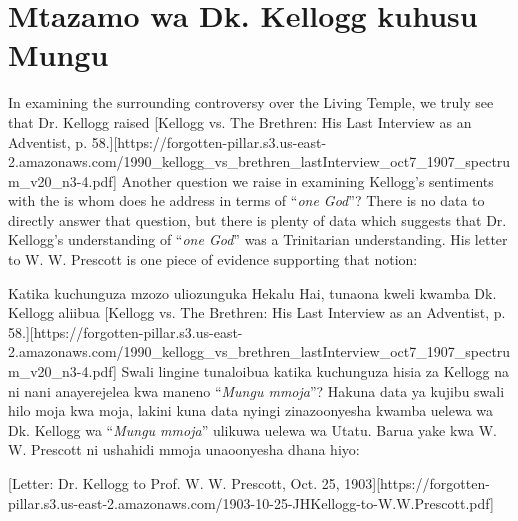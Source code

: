 \section*{Mtazamo wa Dk. Kellogg kuhusu Mungu}


In examining the surrounding controversy over the Living Temple, we truly see that Dr. Kellogg raised [Kellogg vs. The Brethren: His Last Interview as an Adventist, p. 58.][https://forgotten-pillar.s3.us-east-2.amazonaws.com/1990\_kellogg\_vs\_brethren\_lastInterview\_oct7\_1907\_spectrum\_v20\_n3-4.pdf] Another question we raise in examining Kellogg's sentiments with the  is whom does he address in terms of “\textit{one God}”? There is no data to directly answer that question, but there is plenty of data which suggests that Dr. Kellogg's understanding of “\textit{one God}” was a Trinitarian understanding. His letter to W. W. Prescott is one piece of evidence supporting that notion:


Katika kuchunguza mzozo uliozunguka Hekalu Hai, tunaona kweli kwamba Dk. Kellogg aliibua [Kellogg vs. The Brethren: His Last Interview as an Adventist, p. 58.][https://forgotten-pillar.s3.us-east-2.amazonaws.com/1990\_kellogg\_vs\_brethren\_lastInterview\_oct7\_1907\_spectrum\_v20\_n3-4.pdf] Swali lingine tunaloibua katika kuchunguza hisia za Kellogg na  ni nani anayerejelea kwa maneno “\textit{Mungu mmoja}”? Hakuna data ya kujibu swali hilo moja kwa moja, lakini kuna data nyingi zinazoonyesha kwamba uelewa wa Dk. Kellogg wa “\textit{Mungu mmoja}” ulikuwa uelewa wa Utatu. Barua yake kwa W. W. Prescott ni ushahidi mmoja unaoonyesha dhana hiyo:


[Letter: Dr. Kellogg to Prof. W. W. Prescott, Oct. 25, 1903][https://forgotten-pillar.s3.us-east-2.amazonaws.com/1903-10-25-JHKellogg-to-W.W.Prescott.pdf]


